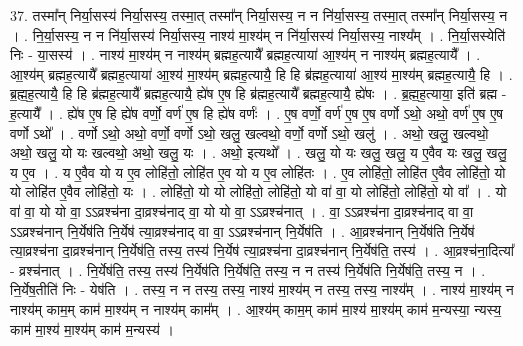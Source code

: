 \documentclass[17pt]{extarticle}
\begin{document}
37. तस्मा᳚न् निर्या॒सस्य॑ निर्या॒सस्य॒ तस्मा॒त् तस्मा᳚न् निर्या॒सस्य॒ न न नि॑र्या॒सस्य॒ तस्मा॒त् तस्मा᳚न् निर्या॒सस्य॒ न । . नि॒र्या॒सस्य॒ न न नि॑र्या॒सस्य॑ निर्या॒सस्य॒ नाश्य॑ मा॒श्य॑म् न नि॑र्या॒सस्य॑ निर्या॒सस्य॒ नाश्य᳚म् । . नि॒र्या॒सस्येति॑ निः - या॒सस्य॑ । . नाश्य॑ मा॒श्य॑म् न नाश्य॑म् ब्रह्मह॒त्यायै᳚ ब्रह्मह॒त्याया॑ आ॒श्य॑म् न नाश्य॑म् ब्रह्मह॒त्यायै᳚ । . आ॒श्य॑म् ब्रह्मह॒त्यायै᳚ ब्रह्मह॒त्याया॑ आ॒श्य॑ मा॒श्य॑म् ब्रह्मह॒त्यायै॒ हि हि ब्र॑ह्मह॒त्याया॑ आ॒श्य॑ मा॒श्य॑म् ब्रह्मह॒त्यायै॒ हि । . ब्र॒ह्म॒ह॒त्यायै॒ हि हि ब्र॑ह्मह॒त्यायै᳚ ब्रह्मह॒त्यायै॒ ह्ये॑ष ए॒ष हि ब्र॑ह्मह॒त्यायै᳚ ब्रह्मह॒त्यायै॒ ह्ये॑षः । . ब्र॒ह्म॒ह॒त्याया॒ इति॑ ब्रह्म - ह॒त्यायै᳚ । . ह्ये॑ष ए॒ष हि ह्ये॑ष वर्णो॒ वर्ण॑ ए॒ष हि ह्ये॑ष वर्णः॑ । . ए॒ष वर्णो॒ वर्ण॑ ए॒ष ए॒ष वर्णो ऽथो॒ अथो॒ वर्ण॑ ए॒ष ए॒ष वर्णो ऽथो᳚ । . वर्णो ऽथो॒ अथो॒ वर्णो॒ वर्णो ऽथो॒ खलु॒ खल्वथो॒ वर्णो॒ वर्णो ऽथो॒ खलु॑ । . अथो॒ खलु॒ खल्वथो॒ अथो॒ खलु॒ यो यः खल्वथो॒ अथो॒ खलु॒ यः । . अथो॒ इत्यथो᳚ । . खलु॒ यो यः खलु॒ खलु॒ य ए॒वैव यः खलु॒ खलु॒ य ए॒व । . य ए॒वैव यो य ए॒व लोहि॑तो॒ लोहि॑त ए॒व यो य ए॒व लोहि॑तः । . ए॒व लोहि॑तो॒ लोहि॑त ए॒वैव लोहि॑तो॒ यो यो लोहि॑त ए॒वैव लोहि॑तो॒ यः । . लोहि॑तो॒ यो यो लोहि॑तो॒ लोहि॑तो॒ यो वा॑ वा॒ यो लोहि॑तो॒ लोहि॑तो॒ यो वा᳚ । . यो वा॑ वा॒ यो यो वा॒ ऽऽव्रश्च॑ना दा॒व्रश्च॑नाद् वा॒ यो यो वा॒ ऽऽव्रश्च॑नात् । . वा॒ ऽऽव्रश्च॑ना दा॒व्रश्च॑नाद् वा वा॒ ऽऽव्रश्च॑नान् नि॒र्येष॑ति नि॒र्येष॑ त्या॒व्रश्च॑नाद् वा वा॒ ऽऽव्रश्च॑नान् नि॒र्येष॑ति । . आ॒व्रश्च॑नान् नि॒र्येष॑ति नि॒र्येष॑ त्या॒व्रश्च॑ना दा॒व्रश्च॑नान् नि॒र्येष॑ति॒ तस्य॒ तस्य॑ नि॒र्येष॑ त्या॒व्रश्च॑ना दा॒व्रश्च॑नान् नि॒र्येष॑ति॒ तस्य॑ । . आ॒व्रश्च॑ना॒दित्या᳚ - व्रश्च॑नात् । . नि॒र्येष॑ति॒ तस्य॒ तस्य॑ नि॒र्येष॑ति नि॒र्येष॑ति॒ तस्य॒ न न तस्य॑ नि॒र्येष॑ति नि॒र्येष॑ति॒ तस्य॒ न । . नि॒र्येष॒तीति॑ निः - येष॑ति । . तस्य॒ न न तस्य॒ तस्य॒ नाश्य॑ मा॒श्य॑म् न तस्य॒ तस्य॒ नाश्य᳚म् । . नाश्य॑ मा॒श्य॑म् न नाश्य॑म् काम॒म् काम॑ मा॒श्य॑म् न नाश्य॑म् काम᳚म् । . आ॒श्य॑म् काम॒म् काम॑ मा॒श्य॑ मा॒श्य॑म् काम॑ म॒न्यस्या॒ न्यस्य॒ काम॑ मा॒श्य॑ मा॒श्य॑म् काम॑ म॒न्यस्य॑ । \newline
\pagebreak
{}
\end{document}
